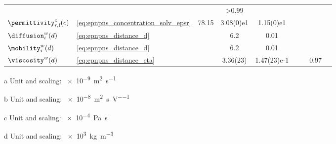 \begin{landscape}
\begin{threeparttable}[p]
\begin{tabularx}{19.25cm}{@{}
            l l S[table-format=1.3] S[table-format=-1.2(2)e-1] S[table-format=-1.2(2)e-1]
            S[table-format=-1.2(2)e-1] S[table-format=-1.2(2)e-1] S[table-format=>1.2] l @{}}
      & & & >0.99 & \cite{Hai-Lang-1996} \\
      $\permittivity_{r,\text{f}}^c(c)$ & \cref{eq:epnpns_concentration_solv_epsr} & 78.15 & 3.08(0)e1 &
      1.15(0)e1 & & & & \cite{Buchner-1999,Gavish-2016} \\
      $\diffusion_{i}^w(d)$ & \cref{eq:epnpns_distance_d} & & 6.2 & 0.01 & & & &
      \cite{Makarov-1998,Simakov-2010,Pederson-2015} \\
      $\mobility_{i}^w(d)$ & \cref{eq:epnpns_distance_d} & & 6.2 & 0.01 & & & &
      \cite{Makarov-1998,Simakov-2010,Pederson-2015} \\
      $\viscosity^w(d)$ & \cref{eq:epnpns_distance_eta} & & 3.36(23) & 1.47(23)e-1 & & & 0.97 &
      \cite{Pronk-2014} \\
      \bottomrule
    \end{tabularx}
    \begin{tablenotes}
      \item[a] Unit and scaling: \SI{e-9}{\square\meter\per\second}
      \item[b] Unit and scaling: \SI{e-8}{\square\meter\per\second\per\volt}
      \item[c] Unit and scaling: \SI{e-4}{\pascal\second}
      \item[d] Unit and scaling: \SI{e3}{\kilo\gram\per\cubic\meter}
    \end{tablenotes}
  \end{threeparttable}
\end{landscape}
%


